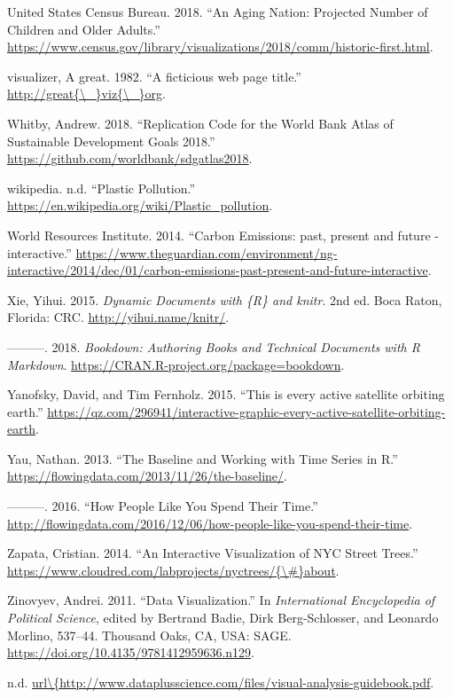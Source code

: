 \documentclass[]{book}
\begin{document}
\leavevmode\hypertarget{ref-aging_nation}{}%
United States Census Bureau. 2018. ``An Aging Nation: Projected Number of Children and Older Adults.'' \url{https://www.census.gov/library/visualizations/2018/comm/historic-first.html}.

\leavevmode\hypertarget{ref-great_viz}{}%
visualizer, A great. 1982. ``A ficticious web page title.'' \href{http://great\%7B/_\%7Dviz\%7B/_\%7Dorg}{http://great\{\textbackslash{}\_\}viz\{\textbackslash{}\_\}org}.

\leavevmode\hypertarget{ref-worldbankcode}{}%
Whitby, Andrew. 2018. ``Replication Code for the World Bank Atlas of Sustainable Development Goals 2018.'' \url{https://github.com/worldbank/sdgatlas2018}.

\leavevmode\hypertarget{ref-wiki_plastic_pollution}{}%
wikipedia. n.d. ``Plastic Pollution.'' \url{https://en.wikipedia.org/wiki/Plastic_pollution}.

\leavevmode\hypertarget{ref-CO2_emission}{}%
World Resources Institute. 2014. ``Carbon Emissions: past, present and future - interactive.'' \url{https://www.theguardian.com/environment/ng-interactive/2014/dec/01/carbon-emissions-past-present-and-future-interactive}.

\leavevmode\hypertarget{ref-xie2015}{}%
Xie, Yihui. 2015. \emph{Dynamic Documents with \{R\} and knitr}. 2nd ed. Boca Raton, Florida: CRC. \url{http://yihui.name/knitr/}.

\leavevmode\hypertarget{ref-R-bookdown}{}%
---------. 2018. \emph{Bookdown: Authoring Books and Technical Documents with R Markdown}. \url{https://CRAN.R-project.org/package=bookdown}.

\leavevmode\hypertarget{ref-Satellite}{}%
Yanofsky, David, and Tim Fernholz. 2015. ``This is every active satellite orbiting earth.'' \url{https://qz.com/296941/interactive-graphic-every-active-satellite-orbiting-earth}.

\leavevmode\hypertarget{ref-baseline_2013}{}%
Yau, Nathan. 2013. ``The Baseline and Working with Time Series in R.'' \url{https://flowingdata.com/2013/11/26/the-baseline/}.

\leavevmode\hypertarget{ref-spendingtime}{}%
---------. 2016. ``How People Like You Spend Their Time.'' \url{http://flowingdata.com/2016/12/06/how-people-like-you-spend-their-time}.

\leavevmode\hypertarget{ref-trees}{}%
Zapata, Cristian. 2014. ``An Interactive Visualization of NYC Street Trees.'' \href{https://www.cloudred.com/labprojects/nyctrees/\%7B/\#\%7Dabout}{https://www.cloudred.com/labprojects/nyctrees/\{\textbackslash{}\#\}about}.

\leavevmode\hypertarget{ref-poli_social_science}{}%
Zinovyev, Andrei. 2011. ``Data Visualization.'' In \emph{International Encyclopedia of Political Science}, edited by Bertrand Badie, Dirk Berg-Schlosser, and Leonardo Morlino, 537--44. Thousand Oaks, CA, USA: SAGE. \url{https://doi.org/10.4135/9781412959636.n129}.

\leavevmode\hypertarget{ref-dataviz_bestprac}{}%
n.d. \href{url/\%7Bhttp://www.dataplusscience.com/files/visual-analysis-guidebook.pdf}{url\textbackslash{}\{http://www.dataplusscience.com/files/visual-analysis-guidebook.pdf}.
\end{document}
